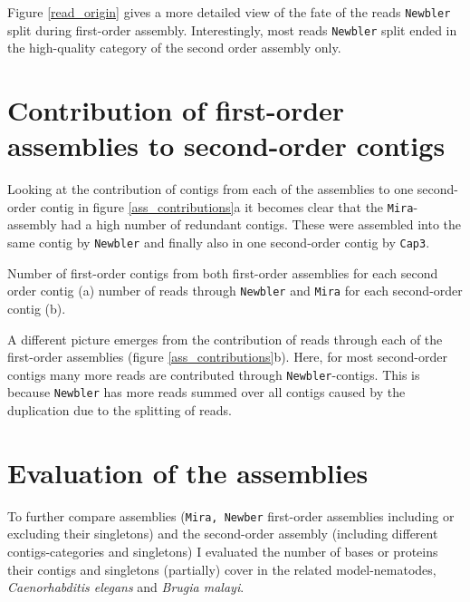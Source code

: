 
Figure \ref{read_origin} gives a more detailed view of the fate of the
reads \texttt{Newbler} split during first-order
assembly. Interestingly, most reads \texttt{Newbler} split ended in
the high-quality category of the second order assembly only.

\section{Contribution of first-order assemblies to second-order contigs}
\label{sec:contr-firs-order}

Looking at the contribution of contigs from each of the assemblies to
one second-order contig in figure \ref{ass_contributions}a it becomes
clear that the \texttt{Mira}-assembly had a high number of redundant
contigs. These were assembled into the same contig by \texttt{Newbler}
and finally also in one second-order contig by \texttt{Cap3}.

{Number of first-order contigs from both first-order assemblies for
  each second order contig (a) number of reads through
  \texttt{Newbler} and \texttt{Mira} for each second-order contig
  (b).}

A different picture emerges from the contribution of reads through
each of the first-order assemblies (figure
\ref{ass_contributions}b). Here, for most second-order contigs many
more reads are contributed through \texttt{Newbler}-contigs. This is
because \texttt{Newbler} has more reads summed over all contigs caused
by the duplication due to the splitting of reads.

\section{Evaluation of the assemblies}
\label{sec:eval-three-assembl}

To further compare assemblies (\texttt{Mira, Newber} first-order
assemblies including or excluding their singletons) and the
second-order assembly (including different contigs-categories and
singletons) I evaluated the number of bases or proteins their contigs
and singletons (partially) cover in the related model-nematodes,
\textit{Caenorhabditis elegans} and \textit{Brugia malayi}.

